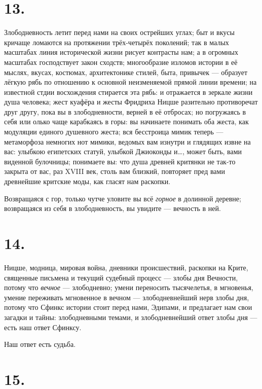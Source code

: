 \documentclass[12pt,a4paper,oneside]{book}
\begin{document}
\section*{13.}

Злободневность летит перед нами на своих острейших углах; быт и вкусы кричаще ломаются на протяжении трёх-четырёх поколений; так в малых масштабах линия исторической жизни рисует контрасты нам; а в огромных масштабах господствует закон сходств; многообразие изломов истории в её мыслях, вкусах, костюмах, архитектонике стилей, быта, привычек — образует лёгкую рябь по отношению к основной неизменяемой прямой линии времени; на известной стдии восхождения стирается эта рябь: и отражается в зеркале жизни душа человека; жест куафёра и жесты Фридриха Ницше разительно противоречат друг другу, пока вы в злободневности, верней в её отбросах; но погружаясь в себя или олько чаще карабкаясь в горы: вы начинаете понимать оба жеста, как модуляции единого душевного жеста; вся бесстроица мимик теперь — метаморфоза немногих нот мимики, ведомых вам изнутри и глядящих извне на вас: улыбкою египетских статуй, улыбкой Джиоконды и…, может быть, вами  виденной булочницы; понимаете вы: что душа древней критянки не так-то закрыта от вас, раз XVIII век, столь вам близкий, повторяет пред вами древнейшие критские моды, как гласят нам раскопки.

Возвращаяся с гор, только чутче уловите вы всё \emph{горное} в долинной деревне; возвращаяся из себя в злободневность, вы увидите — вечность в ней.

\section*{14.}

Ницше, модница, мировая война, дневники происшествий, раскопки на Крите, священные письмена и текущий судебный процесс — злобы дня Вечности, потому что \emph{вечное} — злободневно; умени переносить тысячелетья, в мгновенья, умение переживать мгновенное в вечном — злободневнейший нерв злобы дня, потому что Сфинкс истории стоит перед нами, Эдипами, и предлагает нам свои загадки и тайны: злободневными темами, и злободневнейший ответ злобы дня — есть наш ответ Сфинксу.

Наш ответ есть судьба.

\section*{15.}
\end{document}
